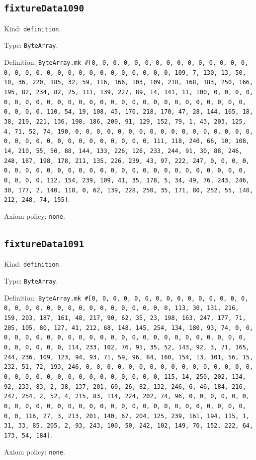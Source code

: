 \documentclass[11pt]{article}
\begin{document}
\subsection*{\texttt{fixtureData1090}}
\noindent Kind: \texttt{definition}.\par
\noindent Type: \texttt{ByteArray}.\par
\noindent Definition: \texttt{ByteArray.mk \#[0, 0, 0, 0, 0, 0, 0, 0, 0, 0, 0, 0, 0, 0, 0, 0, 0, 0, 0, 0, 0, 0, 0, 0, 0, 0, 0, 0, 0, 0, 0, 109, 7, 130, 13, 50, 10, 36, 220, 185, 32, 59, 116, 166, 103, 109, 218, 168, 183, 250, 166, 195, 82, 234, 82, 25, 111, 139, 227, 89, 14, 141, 11, 100, 0, 0, 0, 0, 0, 0, 0, 0, 0, 0, 0, 0, 0, 0, 0, 0, 0, 0, 0, 0, 0, 0, 0, 0, 0, 0, 0, 0, 0, 0, 0, 110, 54, 19, 108, 45, 170, 218, 170, 47, 28, 144, 165, 18, 38, 219, 221, 136, 198, 186, 209, 91, 129, 152, 79, 1, 43, 203, 125, 4, 71, 52, 74, 190, 0, 0, 0, 0, 0, 0, 0, 0, 0, 0, 0, 0, 0, 0, 0, 0, 0, 0, 0, 0, 0, 0, 0, 0, 0, 0, 0, 0, 0, 0, 0, 111, 118, 240, 66, 10, 108, 14, 210, 55, 50, 88, 144, 133, 226, 126, 233, 244, 91, 30, 88, 246, 248, 187, 198, 178, 211, 135, 226, 239, 43, 97, 222, 247, 0, 0, 0, 0, 0, 0, 0, 0, 0, 0, 0, 0, 0, 0, 0, 0, 0, 0, 0, 0, 0, 0, 0, 0, 0, 0, 0, 0, 0, 0, 0, 112, 154, 239, 109, 41, 35, 178, 5, 34, 49, 76, 243, 246, 30, 177, 2, 140, 118, 0, 62, 139, 228, 250, 35, 171, 80, 252, 55, 140, 212, 248, 74, 155]}.\par
\noindent Axiom policy: \texttt{none}.\par
\subsection*{\texttt{fixtureData1091}}
\noindent Kind: \texttt{definition}.\par
\noindent Type: \texttt{ByteArray}.\par
\noindent Definition: \texttt{ByteArray.mk \#[0, 0, 0, 0, 0, 0, 0, 0, 0, 0, 0, 0, 0, 0, 0, 0, 0, 0, 0, 0, 0, 0, 0, 0, 0, 0, 0, 0, 0, 0, 0, 113, 30, 131, 216, 159, 203, 187, 161, 48, 217, 90, 62, 35, 23, 198, 163, 247, 177, 71, 205, 105, 80, 127, 41, 212, 68, 148, 145, 254, 134, 180, 93, 74, 0, 0, 0, 0, 0, 0, 0, 0, 0, 0, 0, 0, 0, 0, 0, 0, 0, 0, 0, 0, 0, 0, 0, 0, 0, 0, 0, 0, 0, 0, 0, 114, 233, 102, 76, 91, 35, 52, 143, 92, 3, 71, 165, 244, 236, 109, 123, 94, 93, 71, 59, 96, 84, 160, 154, 13, 101, 56, 15, 232, 51, 72, 193, 246, 0, 0, 0, 0, 0, 0, 0, 0, 0, 0, 0, 0, 0, 0, 0, 0, 0, 0, 0, 0, 0, 0, 0, 0, 0, 0, 0, 0, 0, 0, 0, 115, 14, 250, 202, 134, 92, 233, 83, 2, 38, 137, 201, 69, 26, 82, 132, 246, 6, 46, 184, 216, 247, 254, 2, 52, 4, 215, 83, 114, 224, 202, 74, 96, 0, 0, 0, 0, 0, 0, 0, 0, 0, 0, 0, 0, 0, 0, 0, 0, 0, 0, 0, 0, 0, 0, 0, 0, 0, 0, 0, 0, 0, 0, 0, 116, 27, 3, 213, 201, 140, 67, 204, 125, 239, 161, 194, 115, 1, 31, 33, 85, 205, 2, 93, 243, 100, 50, 242, 102, 149, 70, 152, 222, 64, 173, 54, 184]}.\par
\noindent Axiom policy: \texttt{none}.\par
\end{document}

